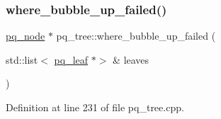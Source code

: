 \subsubsection{\texorpdfstring{where\+\_\+bubble\+\_\+up\+\_\+failed()}{where\_bubble\_up\_failed()}}
{\footnotesize\ttfamily \mbox{\hyperlink{classpq__node}{pq\+\_\+node}} $\ast$ pq\+\_\+tree\+::where\+\_\+bubble\+\_\+up\+\_\+failed (\begin{DoxyParamCaption}\item[{std\+::list$<$ \mbox{\hyperlink{classpq__leaf}{pq\+\_\+leaf}} $\ast$$>$ \&}]{leaves }\end{DoxyParamCaption})\hspace{0.3cm}{\ttfamily [private]}}



Definition at line 231 of file pq\+\_\+tree.\+cpp.


